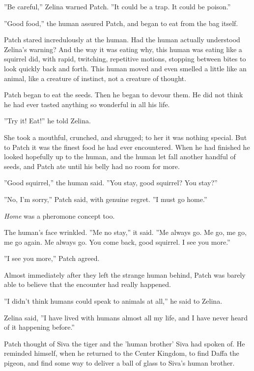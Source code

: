 \documentclass[12pt]{book}
\begin{document}
''Be careful,'' Zelina warned Patch. ''It could be a trap. It could be poison.''\par
''Good food,'' the human assured Patch, and began to eat from the bag itself.\par
Patch stared incredulously at the human. Had the human actually understood Zelina's warning? And the way it was eating %
 why, this human was eating like a squirrel did, with rapid, twitching, repetitive motions, stopping between bites to look quickly back and forth. This human moved and even smelled a little like an animal, like a creature of instinct, not a creature of thought.\par
Patch began to eat the seeds. Then he began to devour them. He did not think he had ever tasted anything so wonderful in all his life.\par
''Try it! Eat!'' he told Zelina.\par
She took a mouthful, crunched, and shrugged; to her it was nothing special. But to Patch it was the finest food he had ever encountered. When he had finished he looked hopefully up to the human, and the human let fall another handful of seeds, and Patch ate until his belly had no room for more.\par
''Good squirrel,'' the human said. ''You stay, good squirrel? You stay?''\par
''No, I'm sorry,'' Patch said, with genuine regret. ''I must go home.''\par
{\it Home} was a pheromone concept too.\par
The human's face wrinkled. ''Me no stay,'' it said. ''Me always go. Me go, me go, me go again. Me always go. You come back, good squirrel. I see you more.''\par
''I see you more,'' Patch agreed.\par
Almost immediately after they left the strange human behind, Patch was barely able to believe that the encounter had really happened.\par
''I didn't think humans could speak to animals at all,'' he said to Zelina.\par
Zelina said, ''I have lived with humans almost all my life, and I have never heard of it happening before.''\par
Patch thought of Siva the tiger and the 'human brother' Siva had spoken of. He reminded himself, when he returned to the Center Kingdom, to find Daffa the pigeon, and find some way to deliver a ball of glass to Siva's human brother.\par
\end{document}
